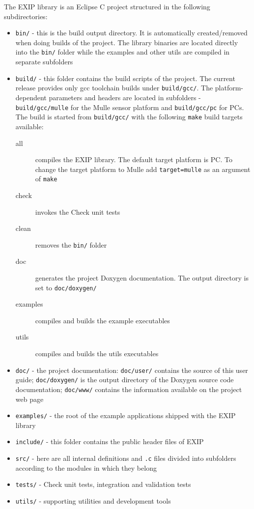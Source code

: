 The EXIP library is an Eclipse C project structured in the following subdirectories:
\begin{itemize}
 \item \texttt{bin/} - this is the build output directory. It is automatically created/removed when
doing builds of the project. The library binaries are located directly into the \texttt{bin/} folder
while the examples and other utils are compiled in separate subfolders

 \item \texttt{build/} - this folder contains the build scripts of the project. The current release
provides only gcc toolchain builds under \texttt{build/gcc/}. The platform-dependent parameters and
headers are located in subfolders - \texttt{build/gcc/mulle} for the Mulle sensor platform and
\texttt{build/gcc/pc} for PCs. The build is started from \texttt{build/gcc/} with the following
\texttt{make} build targets available:
\begin{description}
 \item[all] compiles the EXIP library. The default target platform is PC. To change the target
platform to Mulle add \texttt{target=mulle} as an argument of \texttt{make}
 \item[check] invokes the Check unit tests
 \item[clean] removes the \texttt{bin/} folder
 \item[doc] generates the project Doxygen documentation. The output directory is set to \texttt{doc/doxygen/}
 \item[examples] compiles and builds the example executables
 \item[utils] compiles and builds the utils executables
 \end{description}

 \item \texttt{doc/} - the project documentation: \texttt{doc/user/} contains the source of this user guide;
    \texttt{doc/doxygen/} is the output directory of the Doxygen source code documentation; 
  \texttt{doc/www/} contains the information available on the project web page

 \item \texttt{examples/} - the root of the example applications shipped with the EXIP library

 \item \texttt{include/} - this folder contains the public header files of EXIP

 \item \texttt{src/} - here are all internal definitions and \texttt{.c} files divided into
	      subfolders according to the modules in which they belong

 \item \texttt{tests/} - Check unit tests, integration and validation tests

 \item \texttt{utils/} - supporting utilities and development tools

\end{itemize}


